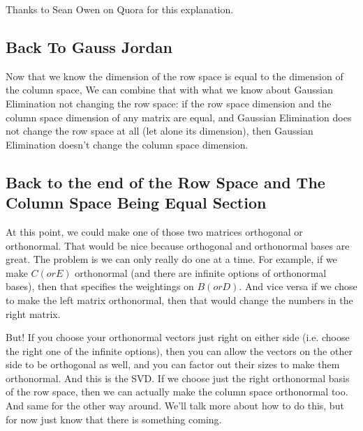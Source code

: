 \documentclass{article}
\begin{document}
Thanks to Sean Owen on Quora for this explanation.

\subsection{Back To Gauss Jordan}

Now that we know the dimension of the row space is equal to the dimension of the column space, We can combine that with what we know about Gaussian Elimination not changing the row space: if the row space dimension and the column space dimension of any matrix are equal, and Gaussian Elimination does not change the row space at all (let alone its dimension), then Gaussian Elimination doesn't change the column space dimension.

\subsection{Back to the end of the Row Space and The Column Space Being Equal Section}

At this point, we could make one of those two matrices orthogonal or orthonormal. That would be nice because orthogonal and orthonormal bases are great. The problem is we can only really do one at a time. For example, if we make $C (or E)$ orthonormal (and there are infinite options of orthonormal bases), then that specifies the weightings on $B (or D)$.  And vice versa if we chose to make the left matrix orthonormal, then that would change the numbers in the right matrix. 

But! If you choose your orthonormal vectors just right on either side (i.e. choose the right one of the infinite options), then you can allow the vectors on the other side to be orthogonal as well, and you can factor out their sizes to make them orthonormal. And this is the SVD.  If we choose just the right orthonormal basis of the row space, then we can actually make the column space orthonormal too.  And same for the other way around. We'll talk more about how to do this, but for now just know that there is something coming.
\end{document}
